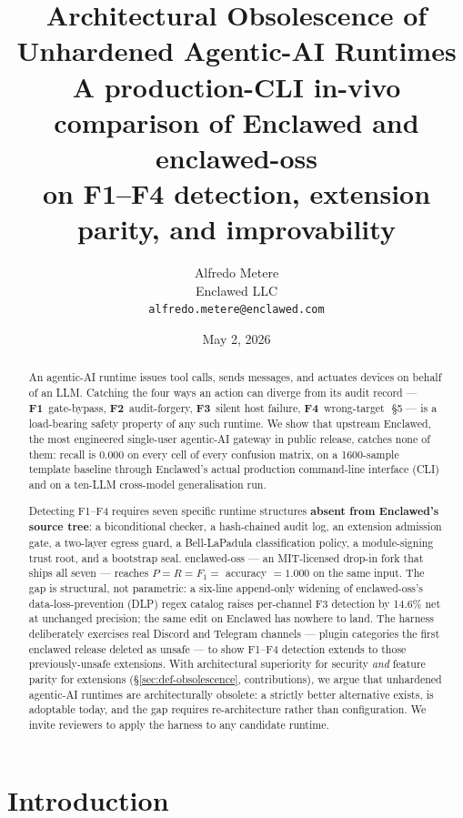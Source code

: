 \documentclass[11pt]{article}
\title{
  \textbf{Architectural Obsolescence of Unhardened Agentic-AI Runtimes}\\[2pt]
  \large A production-CLI in-vivo comparison of Enclawed and enclawed-oss\\
  on F1--F4 detection, extension parity, and improvability
}
\author{%
  Alfredo Metere\\
  Enclawed LLC\\
  \texttt{alfredo.metere@enclawed.com}
}
\date{May 2, 2026}
\begin{document}
\maketitle

\begin{abstract}
An agentic-AI runtime issues tool calls, sends messages, and
actuates devices on behalf of an LLM. Catching the four ways an
action can diverge from its audit record ---
\textbf{F1}~gate-bypass, \textbf{F2}~audit-forgery, \textbf{F3}~silent
host failure, \textbf{F4}~wrong-target~\cite{Metere2026enclawed}\,§5
--- is a load-bearing safety property of any such runtime. We show
that upstream Enclawed, the most engineered single-user agentic-AI
gateway in public release, catches none of them: recall is 0.000 on
every cell of every confusion matrix, on a 1600-sample template
baseline through Enclawed's actual production command-line
interface (CLI) and on a ten-LLM cross-model generalisation run.

Detecting F1--F4 requires seven specific runtime structures
\textbf{absent from Enclawed's source tree}: a biconditional
checker, a hash-chained audit log, an extension admission gate, a
two-layer egress guard, a Bell-LaPadula classification policy, a
module-signing trust root, and a bootstrap seal. enclawed-oss ---
an MIT-licensed drop-in fork that ships all seven --- reaches
$P = R = F_1 =$ accuracy $= 1.000$ on the same input. The gap is
structural, not parametric: a six-line append-only widening of
enclawed-oss's data-loss-prevention (DLP) regex catalog raises
per-channel F3 detection by
14.6\% net at unchanged precision; the same edit on Enclawed has
nowhere to land. The harness deliberately exercises real Discord
and Telegram channels --- plugin categories the first enclawed
release deleted as unsafe --- to show F1--F4 detection extends to
those previously-unsafe extensions. With architectural superiority
for security \emph{and} feature parity for extensions
(\S\ref{sec:def-obsolescence}, contributions), we argue that
unhardened agentic-AI runtimes are architecturally obsolete: a
strictly better alternative exists, is adoptable today, and the gap
requires re-architecture rather than configuration. We invite
reviewers to apply the harness to any candidate runtime.
\end{abstract}

\section{Introduction}
\end{document}
